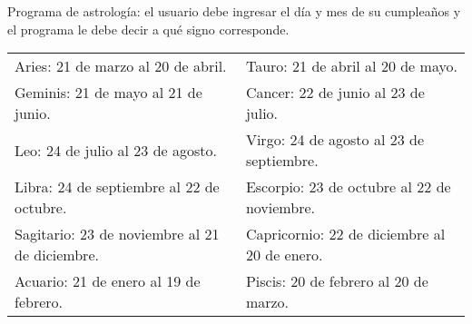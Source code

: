 \begin{ejercicio}
Programa de astrología: el usuario debe ingresar el día y mes de su cumpleaños
y el programa le debe decir a qué signo corresponde.

{\footnotesize
\begin{center}
\begin{tabular}[c]{l l}
Aries: 21 de marzo al 20 de abril. & Tauro: 21 de abril al 20 de mayo. \\
Geminis: 21 de mayo al 21 de junio. & Cancer: 22 de junio al 23 de julio. \\
Leo: 24 de julio al 23 de agosto. & Virgo: 24 de agosto al 23 de septiembre. \\
Libra: 24 de septiembre al 22 de octubre. & Escorpio: 23 de octubre al 22 de noviembre. \\
Sagitario: 23 de noviembre al 21 de diciembre. & Capricornio: 22 de diciembre al 20 de enero. \\
Acuario: 21 de enero al 19 de febrero. & Piscis: 20 de febrero al 20 de marzo. \\
\end{tabular}
\end{center}
}
\end{ejercicio}
